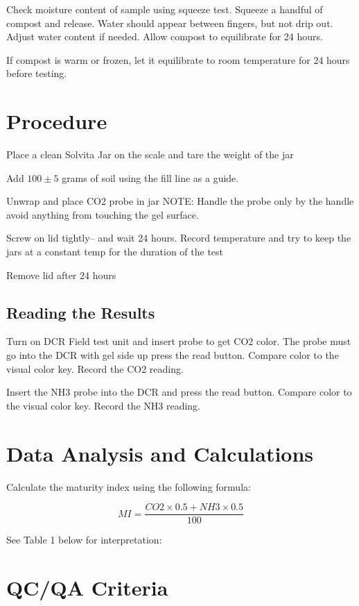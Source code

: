 \documentclass[12pt]{../SOP4_alpha}\usepackage[]{graphicx}\usepackage[]{xcolor}
\begin{document}
\NP Check moisture content of sample using squeeze test. Squeeze a handful of compost and release. Water should appear between fingers, but not drip out. Adjust water content if needed. Allow compost to equilibrate for 24 hours.

\NP If compost is warm or frozen, let it equilibrate to room temperature for 24 hours before testing.


\section{Procedure}

\NP Place a clean Solvita Jar on the scale and tare the weight of the jar 

\NP Add $100 \pm 5$ grams of soil using the fill line as a guide.

\NP Unwrap and place CO2 probe in jar NOTE: Handle the probe only by the handle avoid anything from touching the gel surface.

\NP Screw on lid tightly-- and wait 24 hours. Record temperature and try to keep the jars at a constant temp for the duration of the test

\NP Remove lid after 24 hours

\subsection{Reading the Results}

\NP Turn on DCR Field test unit and insert probe to get CO2 color. The probe must go into the DCR with gel side up press the read button. Compare color to the visual color key. Record the CO2 reading.

\NP Insert the NH3 probe into the DCR and press the read button. Compare color to the visual color key. Record the NH3 reading.


\section{Data Analysis and Calculations}

\NP Calculate the maturity index using the following formula:

\begin{equation}
MI = \frac{CO2 \times 0.5 + NH3 \times 0.5}{100}
\end{equation}

\NP See Table 1 below for interpretation:



\section{QC/QA Criteria}
\end{document}
